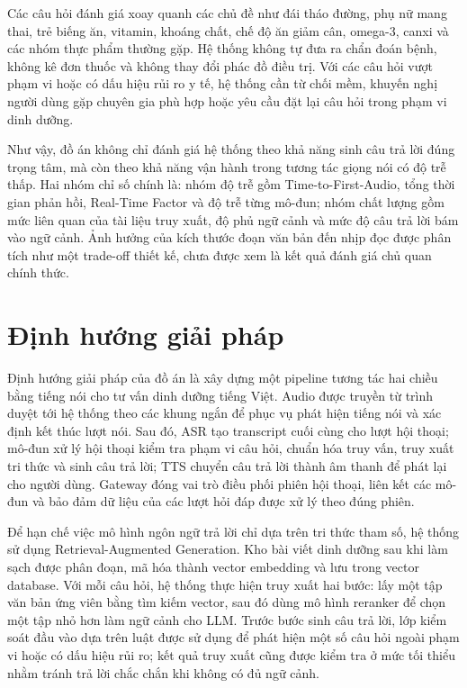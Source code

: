 \documentclass[a4paper,13pt,oneside]{report}
\begin{document}
Các câu hỏi đánh giá xoay quanh các chủ đề như đái tháo đường, phụ nữ mang thai, trẻ biếng ăn, vitamin, khoáng chất, chế độ ăn giảm cân, omega-3, canxi và các nhóm thực phẩm thường gặp. Hệ thống không tự đưa ra chẩn đoán bệnh, không kê đơn thuốc và không thay đổi phác đồ điều trị. Với các câu hỏi vượt phạm vi hoặc có dấu hiệu rủi ro y tế, hệ thống cần từ chối mềm, khuyến nghị người dùng gặp chuyên gia phù hợp hoặc yêu cầu đặt lại câu hỏi trong phạm vi dinh dưỡng.

Như vậy, đồ án không chỉ đánh giá hệ thống theo khả năng sinh câu trả lời đúng trọng tâm, mà còn theo khả năng vận hành trong tương tác giọng nói có độ trễ thấp. Hai nhóm chỉ số chính là: nhóm độ trễ gồm Time-to-First-Audio, tổng thời gian phản hồi, Real-Time Factor và độ trễ từng mô-đun; nhóm chất lượng gồm mức liên quan của tài liệu truy xuất, độ phủ ngữ cảnh và mức độ câu trả lời bám vào ngữ cảnh. Ảnh hưởng của kích thước đoạn văn bản đến nhịp đọc được phân tích như một trade-off thiết kế, chưa được xem là kết quả đánh giá chủ quan chính thức.

\section{Định hướng giải pháp}

Định hướng giải pháp của đồ án là xây dựng một pipeline tương tác hai chiều bằng tiếng nói cho tư vấn dinh dưỡng tiếng Việt. Audio được truyền từ trình duyệt tới hệ thống theo các khung ngắn để phục vụ phát hiện tiếng nói và xác định kết thúc lượt nói. Sau đó, ASR tạo transcript cuối cùng cho lượt hội thoại; mô-đun xử lý hội thoại kiểm tra phạm vi câu hỏi, chuẩn hóa truy vấn, truy xuất tri thức và sinh câu trả lời; TTS chuyển câu trả lời thành âm thanh để phát lại cho người dùng. Gateway đóng vai trò điều phối phiên hội thoại, liên kết các mô-đun và bảo đảm dữ liệu của các lượt hỏi đáp được xử lý theo đúng phiên.

Để hạn chế việc mô hình ngôn ngữ trả lời chỉ dựa trên tri thức tham số, hệ thống sử dụng Retrieval-Augmented Generation. Kho bài viết dinh dưỡng sau khi làm sạch được phân đoạn, mã hóa thành vector embedding và lưu trong vector database. Với mỗi câu hỏi, hệ thống thực hiện truy xuất hai bước: lấy một tập văn bản ứng viên bằng tìm kiếm vector, sau đó dùng mô hình reranker để chọn một tập nhỏ hơn làm ngữ cảnh cho LLM. Trước bước sinh câu trả lời, lớp kiểm soát đầu vào dựa trên luật được sử dụng để phát hiện một số câu hỏi ngoài phạm vi hoặc có dấu hiệu rủi ro; kết quả truy xuất cũng được kiểm tra ở mức tối thiểu nhằm tránh trả lời chắc chắn khi không có đủ ngữ cảnh.
\end{document}
